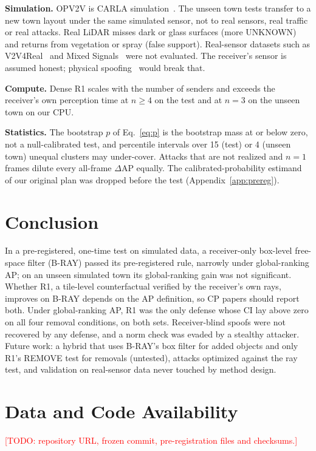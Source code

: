 \documentclass[conference]{IEEEtran}
\newcommand{\TODO}[1]{\textcolor{red}{[TODO: #1]}}
\begin{document}
\textbf{Simulation.} OPV2V is CARLA simulation~\cite{dosovitskiy2017carla}. The unseen town tests transfer to a
new town layout under the same simulated sensor, not to real sensors, real traffic or real attacks. Real LiDAR
misses dark or glass surfaces (more UNKNOWN) and returns from vegetation or spray (false support). Real-sensor
datasets such as V2V4Real~\cite{xu2023v2v4real} and Mixed Signals~\cite{luo2025mixedsignals} were not evaluated.
The receiver's sensor is assumed honest; physical spoofing~\cite{cao2019advlidar} would break that.

\textbf{Compute.} Dense R1 scales with the number of senders and exceeds the receiver's own perception time at
$n\ge 4$ on the test and at $n=3$ on the unseen town on our CPU.

\textbf{Statistics.} The bootstrap $p$ of Eq.~\eqref{eq:p} is the bootstrap mass at or below zero, not a
null-calibrated test, and percentile intervals over 15 (test) or 4 (unseen town) unequal clusters may
under-cover. Attacks that are not realized and $n=1$ frames dilute every all-frame $\Delta$AP equally. The
calibrated-probability estimand of our original plan was dropped before the test (Appendix~\ref{app:prereg}).

\section{Conclusion}
In a pre-registered, one-time test on simulated data, a receiver-only box-level free-space filter (B-RAY) passed
its pre-registered rule, narrowly under global-ranking AP; on an unseen simulated town its global-ranking gain was
not significant. Whether R1, a tile-level counterfactual verified by the receiver's own rays, improves on B-RAY
depends on the AP definition, so CP papers should report both. Under global-ranking AP, R1 was the only defense
whose CI lay above zero on all four removal conditions, on both sets. Receiver-blind spoofs were not recovered by
any defense, and a norm check was evaded by a stealthy attacker. Future work: a hybrid that uses B-RAY's box filter
for added objects and only R1's REMOVE test for removals (untested), attacks optimized against the ray test, and
validation on real-sensor data never touched by method design.

\section*{Data and Code Availability}
\TODO{repository URL, frozen commit, pre-registration files and checksums.}
\end{document}
